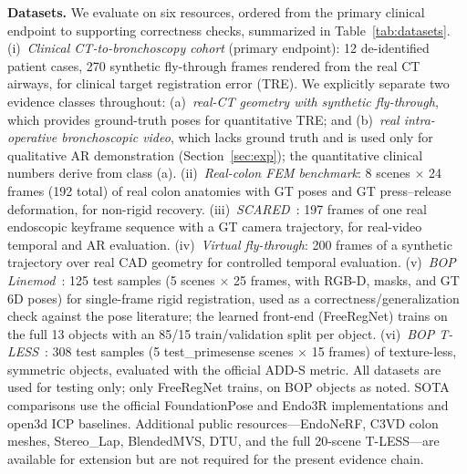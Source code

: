 \documentclass[9pt,twoside,web]{ieeecolor2}
\begin{document}
\textbf{Datasets.} We evaluate on six resources, ordered from the primary clinical endpoint to supporting correctness checks, summarized in Table~\ref{tab:datasets}. (i)~\emph{Clinical CT-to-bronchoscopy cohort} (primary endpoint): 12 de-identified patient cases, 270 synthetic fly-through frames rendered from the real CT airways, for clinical target registration error (TRE). We explicitly separate two evidence classes throughout: (a)~\emph{real-CT geometry with synthetic fly-through}, which provides ground-truth poses for quantitative TRE; and (b)~\emph{real intra-operative bronchoscopic video}, which lacks ground truth and is used only for qualitative AR demonstration (Section~\ref{sec:exp}); the quantitative clinical numbers derive from class (a). (ii)~\emph{Real-colon FEM benchmark}: 8 scenes $\times$ 24 frames (192 total) of real colon anatomies with GT poses and GT press--release deformation, for non-rigid recovery. (iii)~\emph{SCARED}~\cite{allan2021scared}: 197 frames of one real endoscopic keyframe sequence with a GT camera trajectory, for real-video temporal and AR evaluation. (iv)~\emph{Virtual fly-through}: 200 frames of a synthetic trajectory over real CAD geometry for controlled temporal evaluation. (v)~\emph{BOP Linemod}~\cite{hodan2018bop}: 125 test samples (5 scenes $\times$ 25 frames, with RGB-D, masks, and GT 6D poses) for single-frame rigid registration, used as a correctness/generalization check against the pose literature; the learned front-end (FreeRegNet) trains on the full 13 objects with an 85/15 train/validation split per object. (vi)~\emph{BOP T-LESS}~\cite{hodan2018bop}: 308 test samples (5 test\_primesense scenes $\times$ 15 frames) of texture-less, symmetric objects, evaluated with the official ADD-S metric. All datasets are used for testing only; only FreeRegNet trains, on BOP objects as noted. SOTA comparisons use the official FoundationPose and Endo3R implementations and open3d ICP baselines. Additional public resources---EndoNeRF, C3VD colon meshes, Stereo\_Lap, BlendedMVS, DTU, and the full 20-scene T-LESS---are available for extension but are not required for the present evidence chain.
\end{document}
